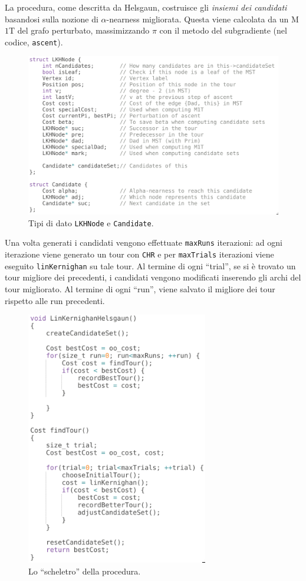 La procedura, come descritta da Helsgaun, costruisce gli \textit{insiemi dei candidati} 
basandosi sulla nozione di $\alpha$-nearness migliorata. Questa viene calcolata da un 
M$1$T del grafo perturbato, massimizzando $\pi$ con il metodo del subgradiente (nel codice, \texttt{ascent}).
\ \\

\begin{figure}[H]
    \centering
    \includegraphics[width=350pt]{img/LKHNode.png}
    \caption{Tipi di dato \texttt{LKHNode} e \texttt{Candidate}.}
\end{figure}


Una volta generati i candidati vengono effettuate \texttt{maxRuns} iterazioni: ad ogni iterazione viene generato 
un tour con \texttt{CHR} e per \texttt{maxTrials} iterazioni viene eseguito \texttt{linKernighan} su tale tour. Al termine 
di ogni ``trial'', se si è trovato un tour migliore dei precedenti, i candidati vengono modificati inserendo 
gli archi del tour migliorato. Al termine di ogni ``run'', viene salvato il migliore dei tour rispetto alle run 
precedenti.

\begin{figure}[H]
    \centering
    \includegraphics[width=225pt]{img/LKHProcedure.png}
    \caption{Lo ``scheletro'' della procedura.}
\end{figure}

